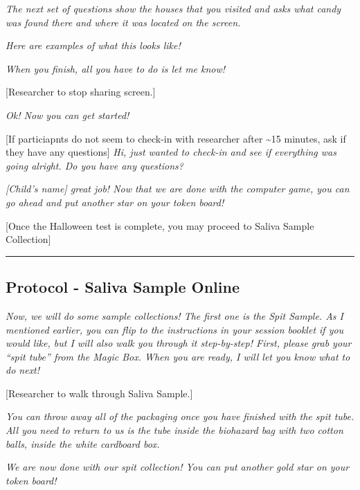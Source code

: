 \documentclass[]{book}
\begin{document}
\emph{The next set of questions show the houses that you visited and asks what candy was found there and where it was located on the screen.}

\emph{Here are examples of what this looks like!}

\emph{When you finish, all you have to do is let me know!}

{[}Researcher to stop sharing screen.{]}

\emph{Ok! Now you can get started!}

{[}If particiapnts do not seem to check-in with researcher after \textasciitilde{}15 minutes, ask if they have any questions{]} \emph{Hi, just wanted to check-in and see if everything was going alright. Do you have any questions?}

\emph{{[}Child's name{]} great job! Now that we are done with the computer game, you can go ahead and put another star on your token board!}

{[}Once the Halloween test is complete, you may proceed to Saliva Sample Collection{]}

\begin{center}\rule{0.5\linewidth}{0.5pt}\end{center}

\hypertarget{protocol---saliva-sample-online}{%
\subsection{Protocol - Saliva Sample Online}\label{protocol---saliva-sample-online}}

\emph{Now, we will do some sample collections! The first one is the Spit Sample. As I mentioned earlier, you can flip to the instructions in your session booklet if you would like, but I will also walk you through it step-by-step! First, please grab your ``spit tube'' from the Magic Box. When you are ready, I will let you know what to do next!}

{[}Researcher to walk through Saliva Sample.{]}

\emph{You can throw away all of the packaging once you have finished with the spit tube. All you need to return to us is the tube inside the biohazard bag with two cotton balls, inside the white cardboard box.}

\emph{We are now done with our spit collection! You can put another gold star on your token board!}
\end{document}
